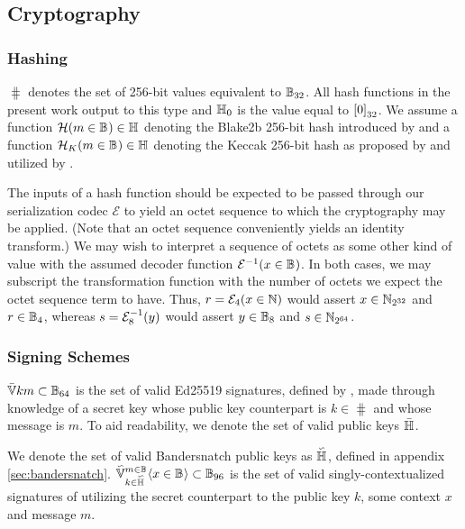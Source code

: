 \subsection{Cryptography}\label{sec:cryptography}

\subsubsection{Hashing}

$\hash$ denotes the set of 256-bit values equivalent to $\blob[32]$. All hash functions in the present work output to this type and $\zerohash$ is the value equal to $\sq{0}_{32}$. We assume a function $\blake{m \in \blob} \in \hash$ denoting the Blake2b 256-bit hash introduced by \cite{rfc7693} and a function $\keccak{m \in \blob} \in \hash$ denoting the Keccak 256-bit hash as proposed by \cite{bertoni2013keccak} and utilized by \cite{wood2014ethereum}.

The inputs of a hash function should be expected to be passed through our serialization codec $\mathcal{E}$ to yield an octet sequence to which the cryptography may be applied. (Note that an octet sequence conveniently yields an identity transform.) We may wish to interpret a sequence of octets as some other kind of value with the assumed decoder function $\decode{x \in \blob}$. In both cases, we may subscript the transformation function with the number of octets we expect the octet sequence term to have. Thus, $r = \mathcal{E}_4(x \in \N)$ would assert $x \in \Nbits{32}$ and $r \in \blob[4]$, whereas $s = \decode[8]{y}$ would assert $y \in \blob[8]$ and $s \in \Nbits{64}$.

\subsubsection{Signing Schemes}\label{sec:signing}

$\edsignaturebase{k}{m} \subset \blob[64]$ is the set of valid Ed25519 signatures, defined by \cite{rfc8032}, made through knowledge of a secret key whose public key counterpart is $k \in \hash$ and whose message is $m$. To aid readability, we denote the set of valid public keys $\edkey$.

We denote the set of valid Bandersnatch public keys as $\bskey$, defined in appendix \ref{sec:bandersnatch}. $\bssignature{k \in \bskey}{x \in \blob}{m \in \blob} \subset \blob[96]$ is the set of valid singly-contextualized signatures of utilizing the secret counterpart to the public key $k$, some context $x$ and message $m$.

